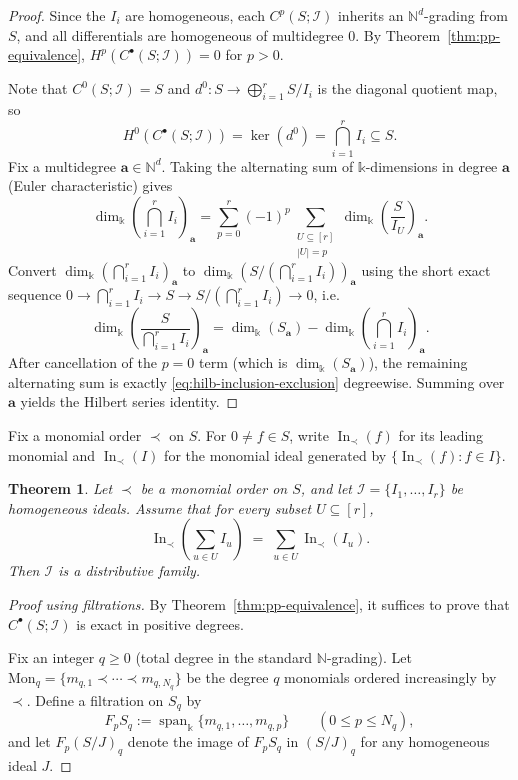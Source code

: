 \documentclass[12pt,reqno]{amsart}
\newtheorem{theorem}[lemma]{Theorem}
\theoremstyle{definition}
\newcommand{\Span}{\operatorname{span}}
\newcommand{\inn}{\operatorname{In}}
\renewcommand{\aa}{\mathbf a}
\renewcommand{\k}{\mathbb{k}}
\newcommand{\cI}{\mathcal{I}}
\newcommand{\NN}{\mathbb{N}}
\newcommand{\Mon}{\text{Mon}}
\def\NN{{\mathbb N}}
\begin{document}
{\begin{proof}
Since the $I_i$ are homogeneous, each $C^p(S;\cI)$ inherits an $\NN^d$-grading from $S$, and all differentials are homogeneous of multidegree $0$.
By Theorem~\ref{thm:pp-equivalence}, $H^p(C^\bullet(S;\cI))=0$ for $p>0$.

Note that $C^0(S;\cI)=S$ and $d^0:S\to \bigoplus_{i=1}^r S/I_i$ is the diagonal quotient map, so
\[
H^0(C^\bullet(S;\cI))=\ker(d^0)=\bigcap_{i=1}^r I_i \subseteq S.
\]
Fix a multidegree $\aa\in\NN^d$. Taking the alternating sum of $\k$-dimensions in degree $\aa$ (Euler characteristic) gives
\[
\dim_\k\!\left(\bigcap_{i=1}^r I_i\right)_\aa
= \sum_{p=0}^r (-1)^p \sum_{\substack{U\subseteq [r]\\ |U|=p}}
\dim_\k\!\left(\frac{S}{I_U}\right)_\aa.
\]
Convert $\dim_\k(\bigcap_{i=1}^r I_i)_\aa$ to $\dim_\k(S/(\bigcap_{i=1}^r I_i))_\aa$ using the short exact sequence
$0\to \bigcap_{i=1}^r I_i \to S \to S/(\bigcap_{i=1}^r I_i)\to 0$, i.e.
\[
\dim_\k\!\left(\frac{S}{\bigcap_{i=1}^r I_i}\right)_\aa
=\dim_\k(S_\aa)-\dim_\k\!\left(\bigcap_{i=1}^r I_i\right)_\aa.
\]
After cancellation of the $p=0$ term (which is $\dim_\k(S_\aa)$), the remaining alternating sum is exactly \eqref{eq:hilb-inclusion-exclusion} degreewise. Summing over $\aa$ yields the Hilbert series identity.
\end{proof}


Fix a monomial order $\prec$ on $S$. For $0\neq f\in S$, write $\inn_\prec(f)$ for its leading monomial
and $\inn_\prec(I)$ for the monomial ideal generated by $\{\inn_\prec(f):f\in I\}$.

\begin{theorem}\label{thm:gb-concatenate-distributive}
Let $\prec$ be a monomial order on $S$, and let $\cI=\{I_1,\dots,I_r\}$ be homogeneous ideals.
Assume that for every subset $U\subseteq [r]$,
\begin{equation}\label{eq:initial-commutes-with-sums}
\inn_\prec\!\left(\sum_{u\in U} I_u\right) \;=\; \sum_{u\in U}\inn_\prec(I_u).
\end{equation}
Then $\cI$ is a distributive family.
\end{theorem}


\begin{proof}[Proof using filtrations]
By Theorem~\ref{thm:pp-equivalence}, it suffices to prove that 
$C^\bullet(S;\cI)$ is exact in positive degrees.

Fix an integer $q\ge 0$ (total degree in the standard $\NN$-grading).
Let $\Mon_q=\{m_{q,1}\prec \cdots \prec m_{q,N_q}\}$ 
be the degree $q$ monomials ordered increasingly by $\prec$.
Define a filtration on $S_q$ by
\[
F_p S_q := \Span_\k\{m_{q,1},\dots,m_{q,p}\}
\qquad (0\le p\le N_q),
\]
and let $F_p(S/J)_q$ denote the image of $F_pS_q$ in $(S/J)_q$ for any homogeneous ideal $J$.


\end{proof}}
\end{document}

